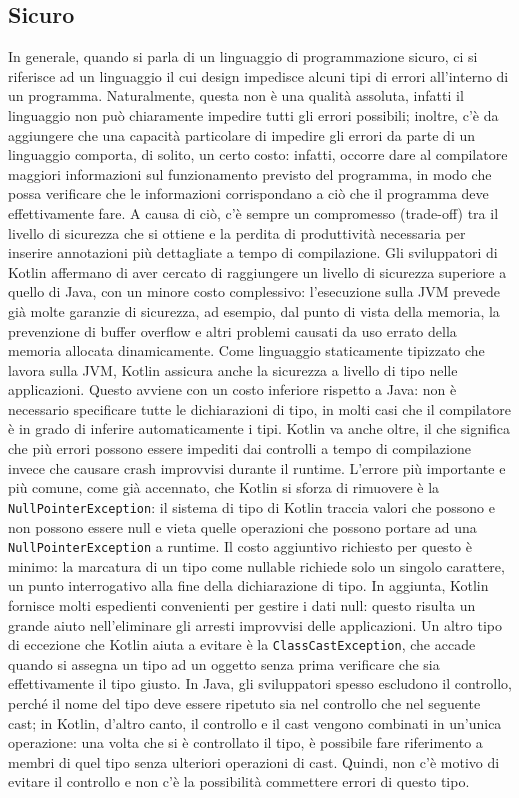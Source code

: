 \subsection{Sicuro}

In generale, quando si parla di un linguaggio di programmazione sicuro, ci si riferisce ad un linguaggio il cui design impedisce alcuni tipi di errori all’interno di un programma. Naturalmente, questa non è una qualità assoluta, infatti il linguaggio non può chiaramente impedire tutti gli errori possibili; inoltre, c’è da aggiungere che una capacità particolare di impedire gli errori da parte di un linguaggio comporta, di solito, un certo costo: infatti, occorre dare al compilatore maggiori informazioni sul funzionamento previsto del programma, in modo che possa verificare che le informazioni corrispondano a ciò che il programma deve effettivamente fare. A causa di ciò, c'è sempre un compromesso (trade-off) tra il livello di sicurezza che si ottiene e la perdita di produttività necessaria per inserire annotazioni più dettagliate a tempo di compilazione. Gli sviluppatori di Kotlin affermano di aver cercato di raggiungere un livello di sicurezza superiore a quello di Java, con un minore costo complessivo: l'esecuzione sulla JVM prevede già molte garanzie di sicurezza, ad esempio, dal punto di vista della memoria, la prevenzione di buffer overflow e altri problemi causati da uso errato della memoria allocata dinamicamente. Come linguaggio staticamente tipizzato che lavora sulla JVM, Kotlin assicura anche la sicurezza a livello di tipo nelle applicazioni. Questo avviene con un costo inferiore rispetto a Java: non è necessario specificare tutte le dichiarazioni di tipo, in molti casi che il compilatore è in grado di inferire automaticamente i tipi. Kotlin va anche oltre, il che significa che più errori possono essere impediti dai controlli a tempo di compilazione invece che causare crash improvvisi durante il runtime. L’errore più importante e più comune, come già accennato, che Kotlin si sforza di rimuovere è la \texttt{NullPointerException}: il sistema di tipo di Kotlin traccia valori che possono e non possono essere null e vieta quelle operazioni che possono portare ad una \texttt{NullPointerException} a runtime. Il costo aggiuntivo richiesto per questo è minimo: la marcatura di un tipo come nullable richiede solo un singolo carattere, un punto interrogativo alla fine della dichiarazione di tipo. In aggiunta, Kotlin fornisce molti espedienti convenienti per gestire i dati null: questo risulta un grande aiuto nell'eliminare gli arresti improvvisi delle applicazioni. Un altro tipo di eccezione che Kotlin aiuta a evitare è la \texttt{ClassCastException}, che accade quando si assegna un tipo ad un oggetto senza prima verificare che sia effettivamente il tipo giusto. In Java, gli sviluppatori spesso escludono il controllo, perché il nome del tipo deve essere ripetuto sia nel controllo che nel seguente cast; in Kotlin, d'altro canto, il controllo e il cast vengono combinati in un'unica operazione: una volta che si è controllato il tipo, è possibile fare riferimento a membri di quel tipo senza ulteriori operazioni di cast. Quindi, non c'è motivo di evitare il controllo e non c’è la possibilità commettere errori di questo tipo.\\

